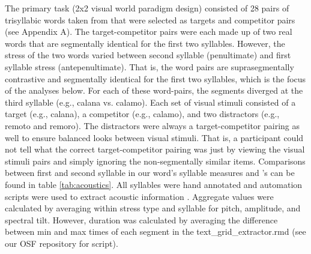 The primary task (2x2 visual world paradigm design) consisted of 28 pairs of trisyllabic words taken from \cite{Sulpizio_McQueen_2012} that were selected as targets and competitor pairs (see Appendix A). The target-competitor pairs were each made up of two real words that are segmentally identical for the first two syllables. However, the stress of the two words varied between second syllable (penultimate) and first syllable stress (antepenultimate). That is, the word pairs are suprasegmentally contrastive and segmentally identical for the first two syllables, which is the focus of the analyses below. For each of these word-pairs, the segments diverged at the third syllable (e.g., calana vs. calamo). Each set of visual stimuli consisted of a target (e.g., calana), a competitor (e.g., calamo), and two distractors (e.g., remoto and remoro). The distractors were always a target-competitor pairing as well to ensure balanced looks between visual stimuli. That is, a participant could not tell what the correct target-competitor pairing was just by viewing the visual stimuli pairs and simply ignoring the non-segmentally similar items. Comparisons between first and second syllable in our word's syllable measures and \cite{Sulpizio_McQueen_2012}'s can be found in table \ref{tab:acoustics}. All syllables were hand annotated and automation scripts were used to extract acoustic information \citep{qi_textgrid_maker, dicanio_vowel_acoustics}. Aggregate values were calculated by averaging within stress type and syllable for pitch, amplitude, and spectral tilt. However, duration was calculated by averaging the difference between min and max times of each segment in the text\_grid\_extractor.rmd (see our OSF repository for script).


